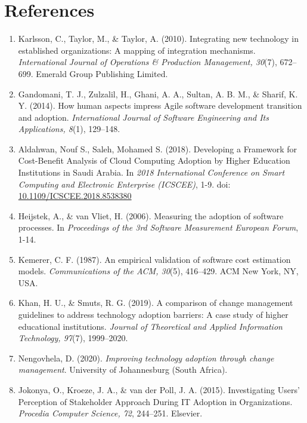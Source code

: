 \documentclass{article}
\begin{document}
\section{References}
\begin{enumerate}
    \item Karlsson, C., Taylor, M., \& Taylor, A. (2010). Integrating new technology in established organizations: A mapping of integration mechanisms. \textit{International Journal of Operations \& Production Management, 30}(7), 672--699. Emerald Group Publishing Limited.
  
    \item Gandomani, T. J., Zulzalil, H., Ghani, A. A., Sultan, A. B. M., \& Sharif, K. Y. (2014). How human aspects impress Agile software development transition and adoption. \textit{International Journal of Software Engineering and Its Applications, 8}(1), 129--148.

    \item Aldahwan, Nouf S., Saleh, Mohamed S. (2018). Developing a Framework for Cost-Benefit Analysis of Cloud Computing Adoption by Higher Education Institutions in Saudi Arabia. In \textit{2018 International Conference on Smart Computing and Electronic Enterprise (ICSCEE)}, 1-9. doi: \url{10.1109/ICSCEE.2018.8538380}

    \item Heijstek, A., \& van Vliet, H. (2006). Measuring the adoption of software processes. In \textit{Proceedings of the 3rd Software Measurement European Forum}, 1-14. 

    \item Kemerer, C. F. (1987). An empirical validation of software cost estimation models. \textit{Communications of the ACM, 30}(5), 416--429. ACM New York, NY, USA.

    \item Khan, H. U., \& Smuts, R. G. (2019). A comparison of change management guidelines to address technology adoption barriers: A case study of higher educational institutions. \textit{Journal of Theoretical and Applied Information Technology, 97}(7), 1999--2020.

    \item Nengovhela, D. (2020). \textit{Improving technology adoption through change management}. University of Johannesburg (South Africa).

    \item Jokonya, O., Kroeze, J. A., \& van der Poll, J. A. (2015). Investigating Users' Perception of Stakeholder Approach During IT Adoption in Organizations. \textit{Procedia Computer Science, 72}, 244--251. Elsevier.

    
\end{enumerate}
\end{document}

